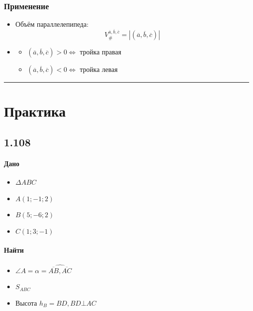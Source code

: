 \documentclass{article}
\begin{document}
\subsubsection{Применение}
\begin{itemize}
    \item Объём параллелепипеда:
    \[
    V_{\#}^{\overline{a}, \overline{b}, \overline{c}} = \left| \left( \overline{a}, \overline{b}, \overline{c} \right) \right|
    \]
    \item
    \begin{itemize}
        \item $\left( \overline{a}, \overline{b}, \overline{c} \right) > 0 \Leftrightarrow$ тройка правая
        \item $\left( \overline{a}, \overline{b}, \overline{c} \right) < 0 \Leftrightarrow$ тройка левая
    \end{itemize}
\end{itemize}



\par\noindent\rule{\textwidth}{1pt}
\section{Практика}

\subsection{1.108}

\paragraph{Дано}
\begin{itemize}
    \item $\Delta ABC$
    \item $A(1; -1; 2)$
    \item $B(5; -6; 2)$
    \item $C(1; 3; -1)$
\end{itemize}

\paragraph{Найти}
\begin{itemize}
    \item $\angle A = \alpha = \widehat{\overline{AB}, \overline{AC}}$
    \item $S_{ABC}$
    \item Высота $h_B = BD, BD \bot AC$
\end{itemize}
\end{document}
